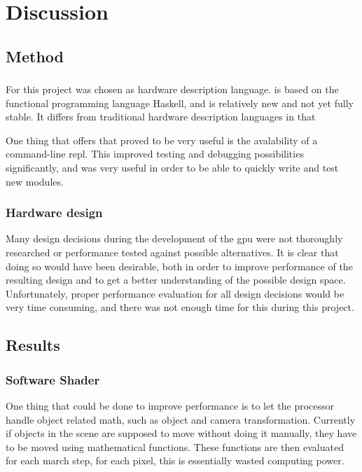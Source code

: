 \chapter{Discussion}
	
	\section{Method}
		
		\subsection{\clash}

			For this project \clash was chosen as hardware description language.
			\clash is based on the functional programming language Haskell, and
			is relatively new and not yet fully stable. It differs from 
			traditional hardware description languages in that 

			One thing that \clash offers that proved to be very useful is the 
			avalability of a command-line repl. This improved testing and 
			debugging possibilities significantly, and was very useful in order
			to be able to quickly write and test new modules.

		\subsection{Hardware design}

			Many design decisions during the development of the gpu were not
			thoroughly researched or performance tested against possible
			alternatives. It is clear that doing so would have been desirable,
			both in order to improve performance of the resulting design and to
			get a better understanding of the possible design space. 
			Unfortunately, proper performance evaluation for all design 
			decisions would be very time consuming, and there was not enough 
			time for this during this project.

	\section{Results}
		
		\subsection{Software Shader}
		
			One thing that could be done to improve performance is to let the
			processor handle object related math, such as object and camera 
			transformation. Currently if objects in the scene are supposed to 
			move without doing it manually, they have to be moved using 
			mathematical functions. These functions are then evaluated for 
			each march step, for each pixel, this is essentially wasted 
			computing power.

